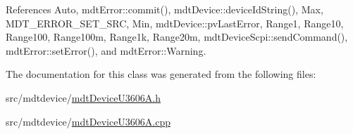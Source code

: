 References Auto, mdt\-Error\-::commit(), mdt\-Device\-::device\-Id\-String(), Max, M\-D\-T\-\_\-\-E\-R\-R\-O\-R\-\_\-\-S\-E\-T\-\_\-\-S\-R\-C, Min, mdt\-Device\-::pv\-Last\-Error, Range1, Range10, Range100, Range100m, Range1k, Range20m, mdt\-Device\-Scpi\-::send\-Command(), mdt\-Error\-::set\-Error(), and mdt\-Error\-::\-Warning.



The documentation for this class was generated from the following files\-:\begin{DoxyCompactItemize}
\item 
src/mdtdevice/\hyperlink{mdt_device_u3606_a_8h}{mdt\-Device\-U3606\-A.\-h}\item 
src/mdtdevice/\hyperlink{mdt_device_u3606_a_8cpp}{mdt\-Device\-U3606\-A.\-cpp}\end{DoxyCompactItemize}
